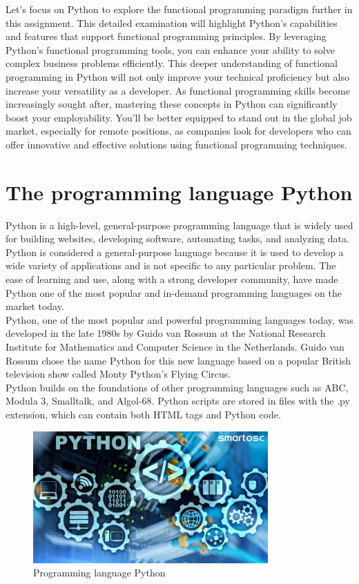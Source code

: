 \documentclass[12pt]{article}
\begin{document}
Let's focus on Python to explore the functional programming paradigm further in this assignment. This detailed examination will highlight Python's capabilities and features that support functional programming principles. By leveraging Python's functional programming tools, you can enhance your ability to solve complex business problems efficiently. This deeper understanding of functional programming in Python will not only improve your technical proficiency but also increase your versatility as a developer. As functional programming skills become increasingly sought after, mastering these concepts in Python can significantly boost your employability. You'll be better equipped to stand out in the global job market, especially for remote positions, as companies look for developers who can offer innovative and effective solutions using functional programming techniques.

\section{The programming language Python}
Python is a high-level, general-purpose programming language that is widely used for building websites, developing software, automating tasks, and analyzing data. Python is considered a general-purpose language because it is used to develop a wide variety of applications and is not specific to any particular problem. The ease of learning and use, along with a strong developer community, have made Python one of the most popular and in-demand programming languages on the market today.\\

Python, one of the most popular and powerful programming languages today, was developed in the late 1980s by Guido van Rossum at the National Research Institute for Mathematics and Computer Science in the Netherlands. Guido van Rossum chose the name Python for this new language based on a popular British television show called Monty Python’s Flying Circus.\\

Python builds on the foundations of other programming languages such as ABC, Modula 3, Smalltalk, and Algol-68. Python scripts are stored in files with the .py extension, which can contain both HTML tags and Python code.\\

\begin{figure}[h!]
\begin{center}
\includegraphics[width=9cm]{Python1.png}\\
Programming language Python
\end{center}
\end{figure}
\end{document}
